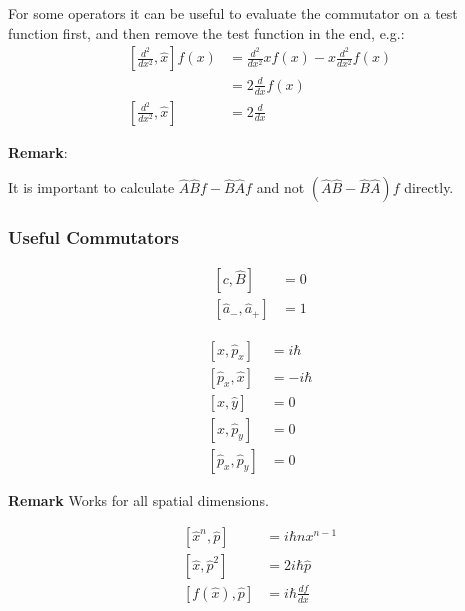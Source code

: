 
For some operators it can be useful to evaluate the commutator on a test function first, and then remove the test function in the end, e.g.:
\noindent\begin{align*}
    \left[\frac{d^2}{dx^2}, \widehat{x}\right] f(x) & = \frac{d^2}{dx^2} xf(x) - x\frac{d^2}{dx^2}f(x) \\
                                                    & = 2\frac{d}{dx} f(x)                             \\
    \left[\frac{d^2}{dx^2}, \widehat{x}\right]      & = 2\frac{d}{dx}
\end{align*}

\textbf{Remark}:

It is important to calculate $\widehat{A}\widehat{B}f - \widehat{B}\widehat{A}f$ and not $(\widehat{A}\widehat{B} - \widehat{B}\widehat{A})f$ directly.

\subsubsection{Useful Commutators}

\noindent\begin{align*}
    \left[c,\hat B\right]                        & =0  \\
    \left[\widehat{a}_{-},\widehat{a}_{+}\right] & = 1
\end{align*}

\newpar{}

\noindent\begin{align*}
    \left[\widehat{x},\widehat{p}_x\right]    & = i\hbar  \\
    \left[\widehat{p}_x, \widehat{x}\right]   & = -i\hbar \\
    \left[\widehat{x}, \widehat{y}\right]     & = 0       \\
    \left[\widehat{x}, \widehat{p}_y\right]   & = 0       \\
    \left[\widehat{p}_x, \widehat{p}_y\right] & = 0
\end{align*}

\textbf{Remark} Works for all spatial dimensions.

\newpar{}
\noindent\begin{align*}
    \left[\widehat{x}^n,\widehat{p}\right]  & = i \hbar n x^{n-1}    \\
    \left[\widehat{x},\widehat{p}^2\right]  & = 2i\hbar\widehat{p}   \\
    \left[f(\widehat{x}),\widehat{p}\right] & = i \hbar\frac{df}{dx}
\end{align*}


